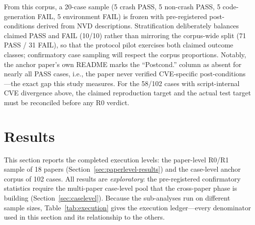 \documentclass[11pt]{article}
\begin{document}
From this corpus, a 20-case sample (5 crash PASS, 5 non-crash PASS, 5 code-generation FAIL, 5 environment FAIL) is frozen with pre-registered post-conditions derived from NVD descriptions. Stratification deliberately balances claimed PASS and FAIL (10/10) rather than mirroring the corpus-wide split (71 PASS / 31 FAIL), so that the protocol pilot exercises both claimed outcome classes; confirmatory case sampling will respect the corpus proportions. Notably, the anchor paper's own README marks the ``Postcond.'' column as absent for nearly all PASS cases, i.e., the paper never verified CVE-specific post-conditions---the exact gap this study measures. For the 58/102 cases with script-internal CVE divergence above, the claimed reproduction target and the actual test target must be reconciled before any R0 verdict.

\section{Results}
\label{sec:calibration}
This section reports the completed execution levels: the paper-level R0/R1 sample of 18 papers (Section~\ref{sec:paperlevel-results}) and the case-level anchor corpus of 102 cases. All results are \emph{exploratory}: the pre-registered confirmatory statistics require the multi-paper case-level pool that the cross-paper phase is building (Section~\ref{sec:caselevel}). Because the sub-analyses run on different sample sizes, Table~\ref{tab:execution} gives the execution ledger---every denominator used in this section and its relationship to the others.
\end{document}
